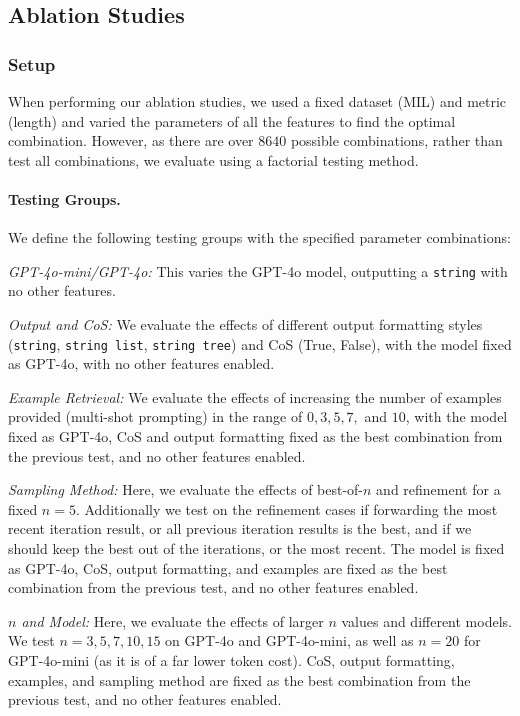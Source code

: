 \subsection{Ablation Studies}
\label{sec:improver_ablation}

\subsubsection{Setup}
\label{sssec:ablations}

When performing our ablation studies, we used a fixed dataset (MIL) and metric (length) and varied the parameters of all the features to find the optimal combination. However, as there are over $8640$ possible combinations, rather than test all combinations, we evaluate using a factorial testing method.

\paragraph{Testing Groups.} We define the following testing groups with the specified parameter combinations:

\textit{GPT-4o-mini/GPT-4o:} This varies the GPT-4o model, outputting a \texttt{string} with no other features.

\textit{Output and CoS:} We evaluate the effects of different output formatting styles (\texttt{string}, \texttt{string list}, \texttt{string tree}) and CoS (True, False), with the model fixed as GPT-4o, with no other features enabled.

\textit{Example Retrieval:} We evaluate the effects of increasing the number of examples provided (multi-shot prompting) in the range of $0,3,5,7,$ and $10$, with the model fixed as GPT-4o, CoS and output formatting fixed as the best combination from the previous test, and no other features enabled.

\textit{Sampling Method:} Here, we evaluate the effects of best-of-$n$ and refinement for a fixed $n=5$. Additionally we test on the refinement cases if forwarding the most recent iteration result, or all previous iteration results is the best, and if we should keep the best out of the iterations, or the most recent. The model is fixed as GPT-4o, CoS, output formatting, and examples are fixed as the best combination from the previous test, and no other features enabled.

\textit{$n$ and Model:} Here, we evaluate the effects of larger $n$ values and different models. We test $n=3,5,7,10,15$ on GPT-4o and GPT-4o-mini, as well as $n=20$ for GPT-4o-mini (as it is of a far lower token cost). CoS, output formatting, examples, and sampling method are fixed as the best combination from the previous test, and no other features enabled.

